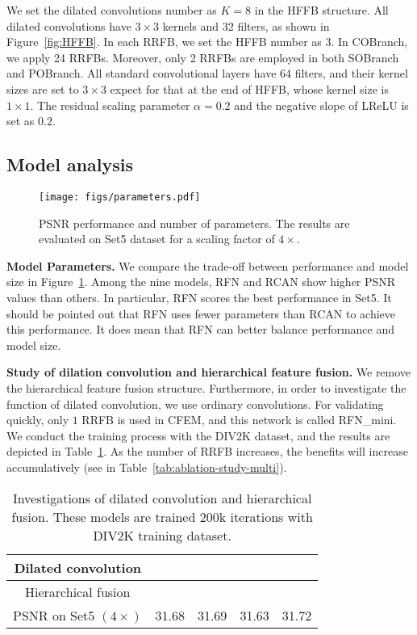 \documentclass[preprint]{elsarticle}
\begin{document}
We set the dilated convolutions number as $K=8$ in the HFFB structure. All dilated convolutions have $3 \times 3$ kernels and 32 filters, as shown in Figure~\ref{fig:HFFB}. In each RRFB, we set the HFFB number as 3. In COBranch, we apply 24 RRFBs. Moreover, only 2 RRFBs are employed in both SOBranch and POBranch. All standard convolutional layers have 64 filters, and their kernel sizes are set to $3 \times 3$ expect for that at the end of HFFB, whose kernel size is $1 \times 1$.  The residual scaling parameter $\alpha=0.2$ and the negative slope of LReLU is set as $0.2$.

\subsection{Model analysis}
\begin{figure}[htbp]
	\begin{center}
		\texttt{[image: figs/parameters.pdf]}
	\end{center}
	\caption{PSNR performance and number of parameters. The results are evaluated on Set5 dataset for a scaling factor of $4 \times$.}
	\label{fig:parameters}
\end{figure}
\textbf{Model Parameters.} We compare the trade-off between performance and model size in Figure~\ref{fig:parameters}. Among the nine models, RFN and RCAN show higher PSNR values than others. In particular, RFN scores the best performance in Set5. It should be pointed out that RFN uses fewer parameters than RCAN to achieve this performance. It does mean that RFN can better balance performance and model size.


\textbf{Study of dilation convolution and hierarchical feature fusion.} We remove the hierarchical feature fusion structure. Furthermore, in order to investigate the function of dilated convolution, we use ordinary convolutions. For validating quickly, only $1$ RRFB is used in CFEM, and this network is called RFN\_mini. We conduct the training process with the DIV2K dataset, and the results are depicted in Table~\ref{tab:ablation-study}. As the number of RRFB increases, the benefits will increase accumulatively (see in Table~\ref{tab:ablation-study-multi}).

\begin{table}[htbp]
	\caption{Investigations of dilated convolution and hierarchical fusion. These models are trained 200k iterations with DIV2K training dataset.}
	\label{tab:ablation-study}
	\begin{center}
		\begin{tabular}{|c|c|c|c|c|}
			\hline
			Dilated convolution & \XSolidBrush & \XSolidBrush & \Checkmark & \Checkmark \\
			\hline
			Hierarchical fusion & \XSolidBrush & \Checkmark & \XSolidBrush & \Checkmark \\
			\hline
			\hline
			PSNR on Set5 $\left( 4 \times \right)$ & 31.68 & 31.69 & 31.63 & 31.72 \\
			\hline
		\end{tabular}
		
	\end{center}
\end{table}
\end{document}

